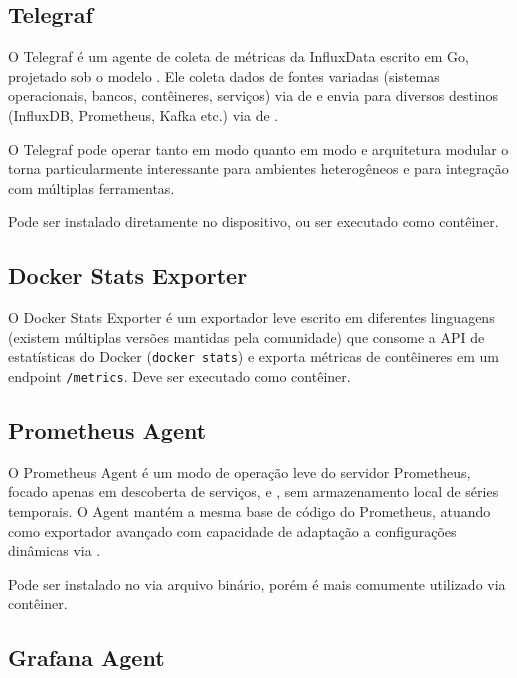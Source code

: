 \subsection{Telegraf}
\label{subsection:Telegraf}

O Telegraf \citep{telegraf2025} é um agente de coleta de métricas da InfluxData escrito em Go, projetado sob o modelo . Ele coleta dados de fontes variadas (sistemas operacionais, bancos, contêineres, serviços) via  de  e envia para diversos destinos (InfluxDB, Prometheus, Kafka etc.) via  de .

O Telegraf pode operar tanto em modo  quanto em modo  e arquitetura modular o torna particularmente interessante para ambientes heterogêneos e para integração com múltiplas ferramentas.

Pode ser instalado diretamente no dispositivo, ou ser executado como contêiner.

\subsection{Docker Stats Exporter}
\label{subsection:DockerStatsExporter}

O Docker Stats Exporter \citep{dockerstatsexporter2025} é um exportador leve escrito em diferentes linguagens (existem múltiplas versões mantidas pela comunidade) que consome a API de estatísticas do Docker (\verb|docker stats|) e exporta métricas de contêineres em um endpoint \verb|/metrics|. 
Deve ser executado como contêiner.

\subsection{Prometheus Agent}
\label{subsection:PrometheusAgent}

O Prometheus Agent \citep{promagent2025} é um modo de operação leve do servidor Prometheus, focado apenas em descoberta de serviços,  e , sem armazenamento local de séries temporais. O Agent mantém a mesma base de código do Prometheus, atuando como exportador avançado com capacidade de adaptação a configurações dinâmicas via .

Pode ser instalado no  via arquivo binário, porém é mais comumente utilizado via contêiner.

\subsection{Grafana Agent}
\label{subsection:GrafanaAgent}

